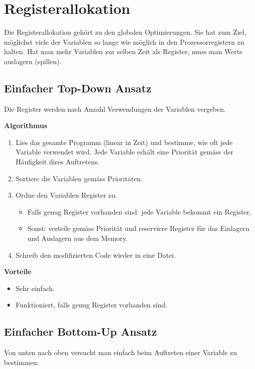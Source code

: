 \section{Registerallokation}


Die Registerallokation gehört zu den globalen Optimierungen. Sie hat zum Ziel,
möglichst viele der Variablen so lange wie möglich in den Prozessorregistern zu
halten. Hat man mehr Variablen zur selben Zeit als Register, muss man Werte
auslagern (spillen).


\subsection{Einfacher Top-Down Ansatz}

Die Register werden nach Anzahl Verwendungen der Variablen vergeben.

\textbf{Algorithmus}

\begin{enumerate}
	\item Lies das gesamte Programm (linear in Zeit) und bestimme, wie oft jede
		Variable verwendet wird. Jede Variable erhält eine Priorität gemäss der
		Häufigkeit ihres Auftretens.
	\item Sortiere die Variablen gemäss Prioritäten.
	\item Ordne den Variablen Register zu.
		\begin{itemize}
			\item Falls genug Register vorhanden sind: jede Variable bekommt ein
				Register.
			\item Sonst: verteile gemäss Priorität und reserviere Register für das
				Einlagern und Auslagern aus dem Memory.
		\end{itemize}
	\item Schreib den modifizierten Code wieder in eine Datei.
\end{enumerate}

\textbf{Vorteile}

\begin{itemize}
	\item Sehr einfach.
	\item Funktioniert, falls genug Register vorhanden sind.
\end{itemize}


\subsection{Einfacher Bottom-Up Ansatz}

Von unten nach oben versucht man einfach beim Auftreten einer Variable zu
bestimmen:

